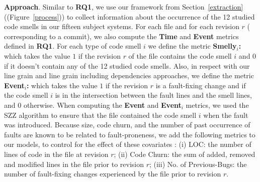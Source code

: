 \textbf{Approach}. Similar to \textbf{RQ1}, we use our framework from Section~\ref{extraction} ({\color{blue}(Figure~\ref{process})}) to collect information about the occurrence of the 12 studied code smells in our {\color{blue}fifteen} subject systems. For each file and for each revision $r$ (\ie{} corresponding to a commit), we also compute the \textbf{Time} and \textbf{Event} metrics defined in \textbf{RQ1}. For each type of code smell $i$ we define the metric \textbf{Smelly$_{i}$:} which takes the value $1$ if the revision $r$ of the file contains the code smell $i$ and $0$ if it doesn't contain any of the 12 studied code smells. {\color{blue}Also, in respect with our line grain and line grain including dependencies approaches, we define the metric \textbf{Event$_{i}$:} which takes the value $1$ if the revision $r$ is a fault-fixing change and if the code smell $i$ is in the intersection between the fault lines and the smell lines, and $0$ otherwise.} When computing the \textbf{Event} {\color{blue}and \textbf{Event$_{i}$} metrics}, we used the SZZ algorithm to ensure that the file contained the code smell $i$ when the fault was introduced. %
Because size, code churn, and the number of past occurrence of faults are known to be related to fault-proneness, we add the following metrics to our models, to control for the effect of these covariates : (i) LOC: the number of lines of code in the file at revision $r$; (ii) Code Churn: the sum of added, removed and modified lines in the file prior to revision $r$; (iii) No. of Previous-Bugs: the number of fault-fixing changes experienced by the file prior to revision $r$.
%
%
%
%

